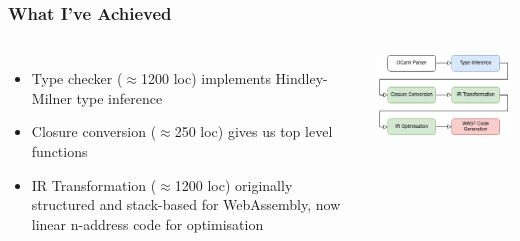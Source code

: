 \documentclass[12pt]{beamer}
\begin{document}
	\begin{frame}
		\frametitle{What I've Achieved}
		\begin{columns}
			\begin{itemize}
				\item Type checker ($\approx$1200 loc) implements Hindley-Milner type inference
				\item Closure conversion ($\approx$250 loc) gives us top level functions
				\item IR Transformation ($\approx$1200 loc) originally structured and stack-based for WebAssembly, now linear n-address code for optimisation
				
			\end{itemize}
			
			\begin{center}
				\includegraphics[width=\linewidth]{otwa-stages}
			\end{center}
		\end{columns}
	\end{frame}
\end{document}
